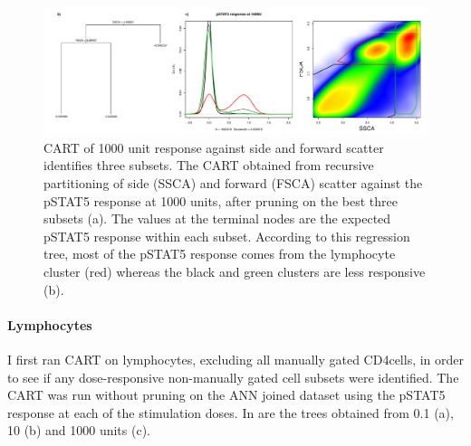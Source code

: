 \begin{figure}[!h]
\centering
\includegraphics[scale=.5]{figures/pstat5-response-decision-tree}
{ CART of 1000 unit response against side and forward scatter identifies three subsets. }
{
    The \gls{CART} obtained from recursive partitioning of side (SSCA) and forward (FSCA) scatter against the pSTAT5 response at 1000 units,
after pruning on the best three subsets (a).
The values at the terminal nodes are the expected pSTAT5 response within each subset.
According to this regression tree, most of the pSTAT5 response comes from the lymphocyte cluster (red) whereas
the black and green clusters are less responsive (b).
} 
\end{figure}

\paragraph{Lymphocytes} 
I first ran CART on lymphocytes, excluding all manually gated CD4\positive cells, in order to see if any dose-responsive
non-manually gated cell subsets were identified.
The CART was run without pruning on the ANN joined dataset using the pSTAT5 response at each of the stimulation doses.
In  are the trees obtained from 0.1 (a), 10 (b)
and 1000 units (c).

